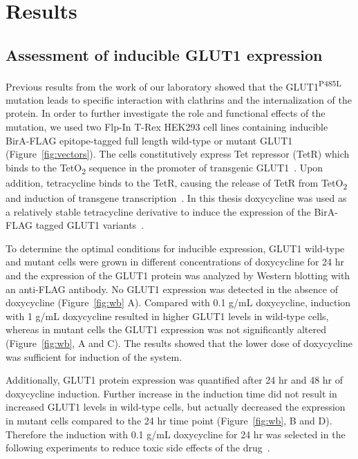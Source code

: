
\chapter{Results} %
\label{Chapter3} %
\section{Assessment of inducible GLUT1 expression}
Previous results from the work of our laboratory showed that the GLUT1\textsuperscript{P485L} mutation leads to specific interaction with clathrins and the internalization of the protein. In order to further investigate the role and functional effects of the mutation, we used two Flp-In T-Rex HEK293 cell lines containing inducible BirA-FLAG epitope-tagged full length wild-type or mutant GLUT1 (Figure~\ref{fig:vectors}). The cells constitutively express Tet repressor (TetR) which binds to the TetO\textsubscript{2} sequence in the promoter of transgenic GLUT1~\cite{Hillen}. Upon addition, tetracycline binds to the TetR, causing the release of TetR from TetO\textsubscript{2} and induction of transgene transcription~\cite{Hillen}. In this thesis doxycycline was used as a relatively stable tetracycline derivative to induce the expression of the BirA-FLAG tagged GLUT1 variants~\cite{Xu}.

To determine the optimal conditions for inducible expression, GLUT1 wild-type and mutant cells were grown in different concentrations of doxycycline for 24 hr and the expression of the GLUT1 protein was analyzed by Western blotting with an anti-FLAG antibody. No GLUT1 expression was detected in the absence of doxycycline (Figure~\ref{fig:wb} A). Compared with 0.1 \textmu g/mL doxycycline, induction with 1 \textmu g/mL doxycycline resulted in higher GLUT1 levels in wild-type cells, whereas in mutant cells the GLUT1 expression was not significantly altered (Figure~\ref{fig:wb}, A and C). The results showed that the lower dose of doxycycline was sufficient for induction of the system. 

Additionally, GLUT1 protein expression was quantified after 24 hr and 48 hr of doxycycline induction. Further increase in the induction time did not result in increased GLUT1 levels in wild-type cells, but actually decreased the expression in mutant cells compared to the 24 hr time point (Figure~\ref{fig:wb}, B and D). Therefore the induction with 0.1 \textmu g/mL doxycycline for 24 hr was selected in the following experiments to reduce toxic side effects of the drug~\cite{Zeltser}.


